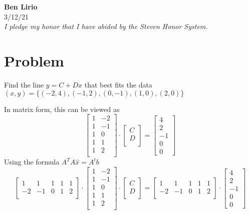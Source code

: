 \documentclass{article}
\begin{document}
\begin{titlepage}
		\begin{center}
		\Large\textbf{Ben Lirio}\\
		\large{3/12/21} \\
		\large\textit{I pledge my honor that I have abided by the Steven Honor System.}
		\end{center}
\end{titlepage}
\section{Problem}
Find the line $y = C + Dx$ that best fits the data 
$(x, y) = \{(-2, 4), (-1, 2), (0, -1), (1, 0), (2, 0)\}$

In matrix form, this can be viewed as
\[
\begin{bmatrix}
1 & -2 \\
1 & -1 \\
1 & 0 \\
1 & 1 \\
1 & 2 \\
\end{bmatrix}
\cdot
\begin{bmatrix}
C \\
D \\
\end{bmatrix}
=
\begin{bmatrix}
4 \\
2 \\
-1 \\
0 \\
0 
\end{bmatrix}
\]
Using the formula $A^{T}A\hat{x} = A^{t}b$
\[
\begin{bmatrix}
1 & 1 & 1 & 1 & 1 \\
-2 & -1 & 0 & 1 & 2 \\
\end{bmatrix}
\cdot
\begin{bmatrix}
1 & -2 \\
1 & -1 \\
1 & 0 \\
1 & 1 \\
1 & 2 \\
\end{bmatrix}
\cdot
\begin{bmatrix}
C \\
D \\
\end{bmatrix}
=
\begin{bmatrix}
1 & 1 & 1 & 1 & 1 \\
-2 & -1 & 0 & 1 & 2 \\
\end{bmatrix}
\cdot
\begin{bmatrix}
4 \\
2 \\
-1 \\
0 \\
0 
\end{bmatrix}
\]
\end{document}
